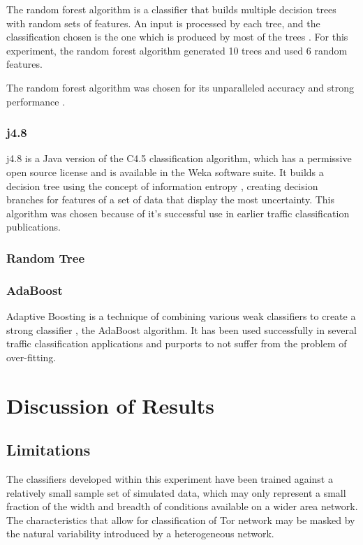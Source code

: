 The random forest algorithm is a classifier that builds multiple decision trees
with random sets of features. An input is processed by each tree, and the
classification chosen is the one which is produced by most of the trees
\parencite{Ho:1995vm}. For this experiment, the random forest algorithm
generated 10 trees and used 6 random features.

The random forest algorithm was chosen for its unparalleled accuracy and strong
performance \parencite{Leo-Breiman:2004fk}.

\subsection{j4.8}

j4.8 is a Java version of the C4.5 classification algorithm, which has a
permissive open source license and is available in the Weka software suite. It
builds a decision tree using the concept of information entropy
\parencite{Quinlan:1993:CPM:152181}, creating decision branches for features of
a set of data that display the most uncertainty. This algorithm was chosen
because of it's successful use in earlier traffic classification publications.

\subsection{Random Tree}

\subsection{AdaBoost}

Adaptive Boosting is a technique of combining various weak classifiers to
create a strong classifier \parencite{Schapire:1999uq}, the AdaBoost algorithm.
It has been used successfully in several traffic classification applications
\parencite{Alshammari:2009p7474,Haffner:2005p3822,Mohd:2009p6484} and purports
to not suffer from the problem of over-fitting.

\chapter{Discussion of Results}

\section{Limitations}

The classifiers developed within this experiment have been trained against
a relatively small sample set of simulated data, which may only represent
a small fraction of the width and breadth of conditions available on a wider
area network. The characteristics that allow for classification of Tor network
may be masked by the natural variability introduced by a heterogeneous network.

